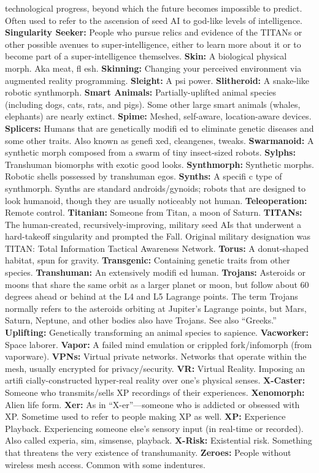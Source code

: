 technological progress, beyond which the future becomes 
impossible to predict. Often used to refer to the ascension 
of seed AI to god-like levels of intelligence.
\textbf{ Singularity Seeker:} People who pursue relics and 
evidence of the TITANs or other possible avenues to 
super-intelligence, either to learn more about it or to 
become part of a super-intelligence themselves.
\textbf{ Skin:} A biological physical morph. Aka meat, ﬂ esh.
\textbf{ Skinning:} Changing your perceived environment via 
augmented reality programming.
\textbf{ Sleight:} A psi power.
\textbf{ Slitheroid:} A snake-like robotic synthmorph.
\textbf{ Smart Animals:} Partially-uplifted animal species (including dogs, cats, rats, and pigs). Some other large smart 
animals (whales, elephants) are nearly extinct.
\textbf{ Spime:} Meshed, self-aware, location-aware devices.
\textbf{ Splicers:} Humans that are genetically modiﬁ ed to 
eliminate genetic diseases and some other traits. Also 
known as geneﬁ xed, cleangenes, tweaks.
\textbf{ Swarmanoid:} A synthetic morph composed from a 
swarm of tiny insect-sized robots.
\textbf{ Sylphs:} Transhuman biomorphs with exotic good looks.
\textbf{ Synthmorph:} Synthetic morphs. Robotic shells possessed 
by transhuman egos.
\textbf{ Synths:} A speciﬁ c type of synthmorph. Synths are 
standard androids/gynoids; robots that are designed to 
look humanoid, though they are usually noticeably not 
human.
\textbf{ Teleoperation:} Remote control.
\textbf{ Titanian:} Someone from Titan, a moon of Saturn.
\textbf{ TITANs:} The human-created, recursively-improving, 
military seed AIs that underwent a hard-takeoff singularity and prompted the Fall. Original military designation 
was TITAN: Total Information Tactical Awareness Network.
\textbf{ Torus:} A donut-shaped habitat, spun for gravity.
\textbf{ Transgenic:} Containing genetic traits from other species.
\textbf{ Transhuman:} An extensively modiﬁ ed human.
\textbf{ Trojans:} Asteroids or moons that share the same orbit 
as a larger planet or moon, but follow about 60 degrees 
ahead or behind at the L4 and L5 Lagrange points. The 
term Trojans normally refers to the asteroids orbiting at 
Jupiter's Lagrange points, but Mars, Saturn, Neptune, and 
other bodies also have Trojans. See also ``Greeks.''
\textbf{ Uplifting:} Genetically transforming an animal species to 
sapience.
\textbf{ Vacworker:} Space laborer.
\textbf{ Vapor:} A failed mind emulation or crippled fork/infomorph (from vaporware).
\textbf{ VPNs:} Virtual private networks. Networks that operate 
within the mesh, usually encrypted for privacy/security.
\textbf{ VR:} Virtual Reality. Imposing an artiﬁ cially-constructed 
hyper-real reality over one's physical senses.
\textbf{ X-Caster:} Someone who transmits/sells XP recordings of 
their experiences.
\textbf{ Xenomorph:} Alien life form.
\textbf{ Xer:} As in ``X-er''—someone who is addicted or 
obsessed with XP. Sometime used to refer to people 
making XP as well.
\textbf{ XP:} Experience Playback. Experiencing someone else's 
sensory input (in real-time or recorded). Also called 
experia, sim, simsense, playback.
\textbf{ X-Risk:} Existential risk. Something that threatens the 
very existence of transhumanity.
\textbf{ Zeroes:} People without wireless mesh access. Common 
with some indentures.


